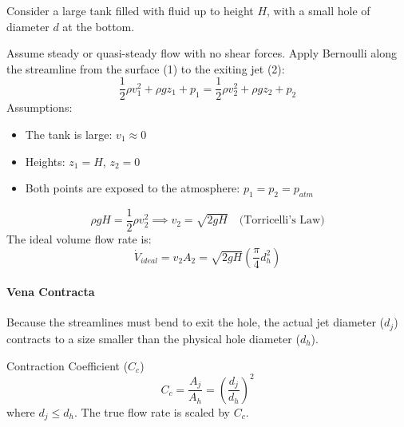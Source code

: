 Consider a large tank filled with fluid up to height $H$, with a small hole of diameter $d$ at the bottom.

\begin{center}
\end{center}

Assume steady or quasi-steady flow with no shear forces. Apply Bernoulli along the streamline from the surface (1) to the exiting jet (2):
\[
\frac{1}{2}\rho v_{1}^{2} + \rho g z_{1} + p_{1} = \frac{1}{2}\rho v_{2}^{2} + \rho g z_{2} + p_{2}
\]
Assumptions:
\begin{itemize}
    \item The tank is large: $v_{1} \approx 0$
    \item Heights: $z_{1} = H$, $z_{2} = 0$
    \item Both points are exposed to the atmosphere: $p_{1} = p_{2} = p_{atm}$
\end{itemize}
\[
\rho g H = \frac{1}{2}\rho v_{2}^{2} \implies v_{2} = \sqrt{2gH} \quad \text{(Torricelli's Law)}
\]
The ideal volume flow rate is:
\[
\dot{V}_{ideal} = v_{2} A_{2} = \sqrt{2gH}\left(\frac{\pi}{4}d_{h}^{2}\right)
\]

\paragraph{Vena Contracta}
Because the streamlines must bend to exit the hole, the actual jet diameter ($d_j$) contracts to a size smaller than the physical hole diameter ($d_h$).
\begin{eqbox}{Contraction Coefficient ($C_c$)}
\[
C_{c} = \frac{A_{j}}{A_{h}} = \left(\frac{d_{j}}{d_{h}}\right)^{2}
\]
where $d_{j} \le d_{h}$. The true flow rate is scaled by $C_c$.
\end{eqbox}